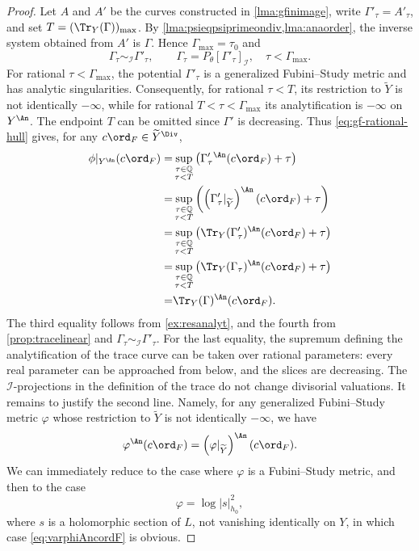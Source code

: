 \begin{proof}
    Let $A$ and $A'$ be the curves constructed in \cref{lma:gfinimage}, write $\Gamma'_{\tau}=A'_{\tau}$, and set $T=(\Tr_Y(\Gamma))_{\max}$. By \cref{lma:psieqpsiprimeondiv,lma:anaorder}, the inverse system obtained from $A'$ is $\Gamma$. Hence $\Gamma_{\max}=\tau_0$ and
    \[
    \Gamma_{\tau}\sim_{\mathcal I}\Gamma'_{\tau},\qquad
    \Gamma_{\tau}=P_{\theta}[\Gamma'_{\tau}]_{\mathcal I},\quad \tau<\Gamma_{\max}.
    \]
    For rational $\tau<\Gamma_{\max}$, the potential $\Gamma'_{\tau}$ is a generalized Fubini--Study metric and has analytic singularities. Consequently, for rational $\tau<T$, its restriction to $\widetilde Y$ is not identically $-\infty$, while for rational $T<\tau<\Gamma_{\max}$ its analytification is $-\infty$ on $Y^{\An}$. The endpoint $T$ can be omitted since $\Gamma'$ is decreasing. Thus \eqref{eq:gf-rational-hull} gives, for any $c\ord_F\in\widetilde Y^{\Div}$,
    \[
    \begin{aligned}
    \phi|_{Y^{\An}}(c\ord_F)=&\sup_{\substack{\tau\in\mathbb Q\\\tau<T}} \left(\Gamma'_{\tau}{}^{\An}(c\ord_F)+\tau\right)\\
    =& \sup_{\substack{\tau\in\mathbb Q\\\tau<T}} \left(\left(\Gamma'_{\tau}|_{\widetilde{Y}}\right)^{\An}(c\ord_F)+\tau\right)\\
    =& \sup_{\substack{\tau\in\mathbb Q\\\tau<T}} \left(\Tr_Y(\Gamma'_{\tau})^{\An}(c\ord_F)+\tau\right)\\
     =& \sup_{\substack{\tau\in\mathbb Q\\\tau<T}} \left(\Tr_Y(\Gamma_{\tau})^{\An}(c\ord_F)+\tau\right)\\
    =& \Tr_Y(\Gamma)^{\An}(c\ord_F).
    \end{aligned}
    \]
    The third equality follows from \cref{ex:resanalyt}, and the fourth from \cref{prop:tracelinear} and $\Gamma_{\tau}\sim_{\mathcal I}\Gamma'_{\tau}$. For the last equality, the supremum defining the analytification of the trace curve can be taken over rational parameters: every real parameter can be approached from below, and the slices are decreasing. The $\mathcal I$-projections in the definition of the trace do not change divisorial valuations. It remains to justify the second line. Namely, for any generalized Fubini--Study metric $\varphi$ whose restriction to $\widetilde{Y}$ is not identically $-\infty$, we have
    \begin{equation}\label{eq:varphiAncordF}
    \varphi^{\An}(c\ord_F)=\left(\varphi|_{\widetilde{Y}}\right)^{\An}(c\ord_F).
    \end{equation}
    We can immediately reduce to the case where $\varphi$ is a Fubini--Study metric, and then to the case
    \[
    \varphi=\log |s|_{h_0}^2,
    \]
    where $s$ is a holomorphic section of $L$, not vanishing identically on $Y$, in which case \eqref{eq:varphiAncordF} is obvious.
\end{proof}


